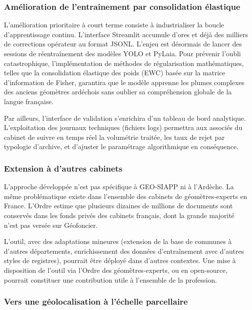 \subsubsection{Amélioration de l'entraînement par consolidation élastique}

L'amélioration prioritaire à court terme consiste à industrialiser la boucle d'apprentissage continu. L'interface Streamlit accumule d'ores et déjà des milliers de corrections opérateur au format JSONL. L'enjeu est désormais de lancer des sessions de réentraînement des modèles YOLO et PyLaia. Pour prévenir l'oubli catastrophique, l'implémentation de méthodes de régularisation mathématiques, telles que la consolidation élastique des poids (EWC) basée sur la matrice d'information de Fisher, garantira que le modèle apprenne les plumes complexes des anciens géomètres ardéchois sans oublier sa compréhension globale de la langue française.

Par ailleurs, l'interface de validation s'enrichira d'un tableau de bord analytique. L'exploitation des journaux techniques (fichiers logs) permettra aux associés du cabinet de suivre en temps réel la volumétrie traitée, les taux de rejet par typologie d'archive, et d'ajuster le paramétrage algorithmique en conséquence.

\subsubsection{Extension à d'autres cabinets}

L'approche développée n'est pas spécifique à GEO-SIAPP ni à l'Ardèche. La même problématique existe dans l'ensemble des cabinets de géomètres-experts en France. L'Ordre estime que plusieurs dizaines de millions de documents sont conservés dans les fonds privés des cabinets français, dont la grande majorité n'est pas versée sur Géofoncier.

L'outil, avec des adaptations mineures (extension de la base de communes à d'autres départements, enrichissement des données d'entraînement avec d'autres styles de registres), pourrait être déployé dans d'autres contextes. Une mise à disposition de l'outil via l'Ordre des géomètres-experts, ou en open-source, pourrait constituer une contribution utile à l'ensemble de la profession.

\subsubsection{Vers une géolocalisation à l'échelle parcellaire}

